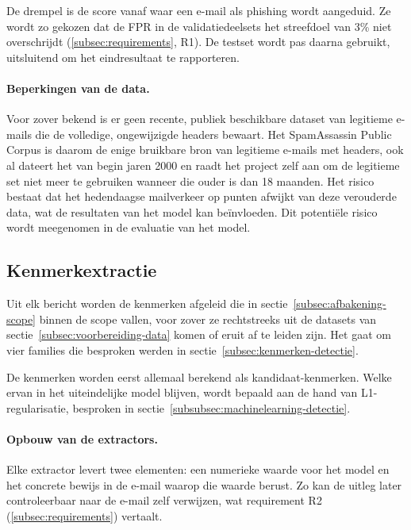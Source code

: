 De drempel is de score vanaf waar een e-mail als phishing wordt aangeduid. Ze wordt zo gekozen dat de FPR in de validatiedeelsets het streefdoel van 3\% niet overschrijdt (\ref{subsec:requirements}, R1). De testset wordt pas daarna gebruikt, uitsluitend om het eindresultaat te rapporteren.

\paragraph{Beperkingen van de data.}
Voor zover bekend is er geen recente, publiek beschikbare dataset van legitieme e-mails die de volledige, ongewijzigde headers bewaart. Het SpamAssassin Public Corpus is daarom de enige bruikbare bron van legitieme e-mails met headers, ook al dateert het van begin jaren 2000 en raadt het project zelf aan om de legitieme set niet meer te gebruiken wanneer die ouder is dan 18 maanden.
Het risico bestaat dat het hedendaagse mailverkeer op punten afwijkt van deze verouderde data, wat de resultaten van het model kan beïnvloeden. Dit potentiële risico wordt meegenomen in de evaluatie van het model.

\subsection{Kenmerkextractie}%
\label{sec:kenmerkextractie}

Uit elk bericht worden de kenmerken afgeleid die in sectie~\ref{subsec:afbakening-scope} binnen de scope vallen, voor zover ze rechtstreeks uit de datasets van sectie~\ref{subsec:voorbereiding-data} komen of eruit af te leiden zijn. Het gaat om vier families die besproken werden in sectie~\ref{subsec:kenmerken-detectie}. 

De kenmerken worden eerst allemaal berekend als kandidaat-kenmerken. Welke ervan in het uiteindelijke model blijven, wordt bepaald aan de hand van L1-regularisatie, besproken in sectie~\ref{subsubsec:machinelearning-detectie}.

\paragraph{Opbouw van de extractors.}
Elke extractor levert twee elementen: een numerieke waarde voor het model en het concrete bewijs in de e-mail waarop die waarde berust. Zo kan de uitleg later controleerbaar naar de e-mail zelf verwijzen, wat requirement R2 (\ref{subsec:requirements}) vertaalt.

